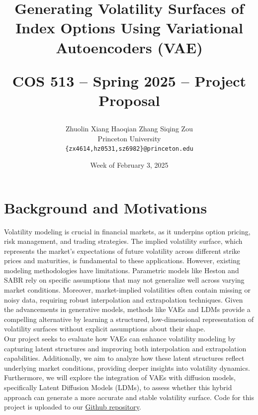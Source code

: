 \documentclass{article}
\title{Generating Volatility Surfaces of Index Options Using Variational Autoencoders (VAE)\\
\begin{large}
COS 513 -- Spring 2025 -- Project Proposal
\end{large} }
\author{%
Zhuolin Xiang \quad Haoqian Zhang \quad Siqing Zou\\
Princeton University \\
\texttt{\{zx4614,hz0531,sz6982\}@princeton.edu}
}
\date{Week of February 3, 2025}
\begin{document}
\maketitle
\textbf{}%

\section{Background and Motivations}


Volatility modeling is crucial in financial markets, as it underpins option pricing, risk management, and trading strategies. The implied volatility surface, which represents the market's expectations of future volatility across different strike prices and maturities, is fundamental to these applications. However, existing modeling methodologies have limitations. Parametric models like Heston and SABR rely on specific assumptions that may not generalize well across varying market conditions. Moreover, market-implied volatilities often contain missing or noisy data, requiring robust interpolation and extrapolation techniques. Given the advancements in generative models, methods like VAEs and LDMs provide a compelling alternative by learning a structured, low-dimensional representation of volatility surfaces without explicit assumptions about their shape.\\

Our project seeks to evaluate how VAEs can enhance volatility modeling by capturing latent structures and improving both interpolation and extrapolation capabilities. Additionally, we aim to analyze how these latent structures reflect underlying market conditions, providing deeper insights into volatility dynamics. Furthermore, we will explore the integration of VAEs with diffusion models, specifically Latent Diffusion Models (LDMs), to assess whether this hybrid approach can generate a more accurate and stable volatility surface. Code for this project is uploaded to our \href{https://github.com/zhanghq-chn/VAE-VolSurface.git}{Github repository}.
\end{document}
